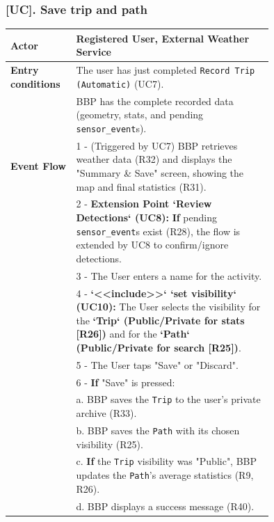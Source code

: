 \subsubsection*{[UC\cuc]. Save trip and path}
\begin{center}
    \begin{longtable}{|l|p{0.75\linewidth}|}
    \hline
    \textbf{Actor}          & Registered User, External Weather Service \\
    \hline
    \textbf{Entry conditions} & The user has just completed \texttt{Record Trip (Automatic)} (UC7). \\
                              & BBP has the complete recorded data (geometry, stats, and pending \texttt{sensor\_event}s). \\
    \hline
    \textbf{Event Flow}     & 1 - (Triggered by UC7) BBP retrieves weather data (R32) and displays the "Summary \& Save" screen, showing the map and final statistics (R31). \\
                            & 2 - \textbf{Extension Point `Review Detections` (UC8):} \textbf{If} pending \texttt{sensor\_event}s exist (R28), the flow is extended by UC8 to confirm/ignore detections. \\
                            & 3 - The User enters a name for the activity. \\
                            & 4 - \textbf{`<<include>>` `set visibility` (UC10):} The User selects the visibility for the \textbf{`Trip` (Public/Private for stats [R26])} and for the \textbf{`Path` (Public/Private for search [R25])}. \\
                            & 5 - The User taps "Save" or "Discard". \\
                            & 6 - \textbf{If} "Save" is pressed: \\
                            & \hspace{1em} a. BBP saves the \texttt{Trip} to the user's private archive (R33). \\
                            & \hspace{1em} b. BBP saves the \texttt{Path} with its chosen visibility (R25). \\
                            & \hspace{1em} c. \textbf{If} the \texttt{Trip} visibility was "Public", BBP updates the \texttt{Path}'s average statistics (R9, R26). \\
                            & \hspace{1em} d. BBP displays a success message (R40). \\

\end{longtable}
\end{center}

